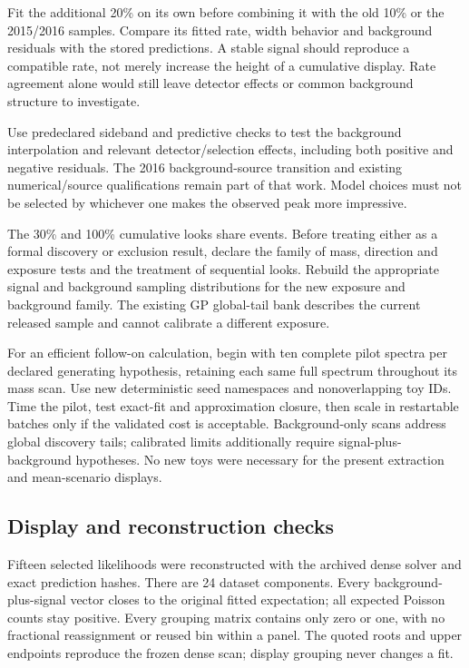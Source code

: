 Fit the additional 20\% on its own before combining it with the old 10\% or the 2015/2016 samples. Compare its fitted rate, width behavior and background residuals with the stored predictions. A stable signal should reproduce a compatible rate, not merely increase the height of a cumulative display. Rate agreement alone would still leave detector effects or common background structure to investigate.

Use predeclared sideband and predictive checks to test the background interpolation and relevant detector/selection effects, including both positive and negative residuals. The 2016 background-source transition and existing numerical/source qualifications remain part of that work. Model choices must not be selected by whichever one makes the observed peak more impressive.

The 30\% and 100\% cumulative looks share events. Before treating either as a formal discovery or exclusion result, declare the family of mass, direction and exposure tests and the treatment of sequential looks. Rebuild the appropriate signal and background sampling distributions for the new exposure and background family. The existing GP global-tail bank describes the current released sample and cannot calibrate a different exposure.

For an efficient follow-on calculation, begin with ten complete pilot spectra per declared generating hypothesis, retaining each same full spectrum throughout its mass scan. Use new deterministic seed namespaces and nonoverlapping toy IDs. Time the pilot, test exact-fit and approximation closure, then scale in restartable batches only if the validated cost is acceptable. Background-only scans address global discovery tails; calibrated limits additionally require signal-plus-background hypotheses. No new toys were necessary for the present extraction and mean-scenario displays.

\clearpage
\subsection*{Display and reconstruction checks}
Fifteen selected likelihoods were reconstructed with the archived dense solver and exact prediction hashes. There are 24 dataset components. Every background-plus-signal vector closes to the original fitted expectation; all expected Poisson counts stay positive. Every grouping matrix contains only zero or one, with no fractional reassignment or reused bin within a panel. The quoted roots and upper endpoints reproduce the frozen dense scan; display grouping never changes a fit.

